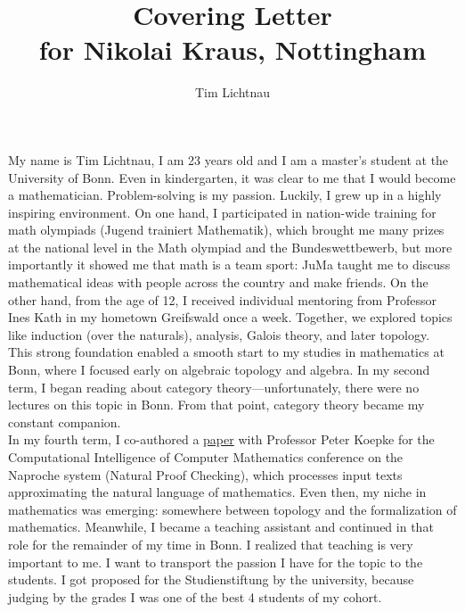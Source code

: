 \documentclass[12pt,headings=small,paper=A4,DIV=calc]{article}
\title{Covering Letter \\  for Nikolai Kraus, Nottingham}
\author{Tim Lichtnau}
\begin{document}
\maketitle
My name is Tim Lichtnau, I am 23 years old and I am a master's student at the University of Bonn. Even in kindergarten, it was clear to me that I would become a mathematician. Problem-solving is my passion. Luckily, I grew up in a highly inspiring environment. On one hand, I participated in nation-wide training for math olympiads (Jugend trainiert Mathematik), which brought me many prizes at the national level in the Math olympiad and the Bundeswettbewerb, but more importantly it showed me that math is a team sport: JuMa taught me to discuss mathematical ideas with people across the country and make friends. On the other hand, from the age of 12, I received individual mentoring from Professor Ines Kath in my hometown Greifswald once a week. Together, we explored topics like induction (over the naturals), analysis, Galois theory, and later topology. \\

This strong foundation enabled a smooth start to my studies in mathematics at Bonn, where I focused early on algebraic topology and algebra. In my second term, I began reading about category theory---unfortunately, there were no lectures on this topic in Bonn. From that point, category theory became my constant companion. \\
In my fourth term, I co-authored a \href{https://ceur-ws.org/Vol-3377/natfom2.pdf}{paper} with Professor Peter Koepke for the Computational Intelligence of Computer Mathematics conference on the Naproche system (Natural Proof Checking), which processes input texts approximating the natural language of mathematics. Even then, my niche in mathematics was emerging: somewhere between topology and the formalization of mathematics. Meanwhile, I became a teaching assistant and continued in that role for the remainder of my time in Bonn. I realized that teaching is very important to me. I want to transport the passion I have for the topic to the students. I got proposed for the Studienstiftung by the university, because judging by the grades I was one of the best 4 students of my cohort.  \\
\end{document}
